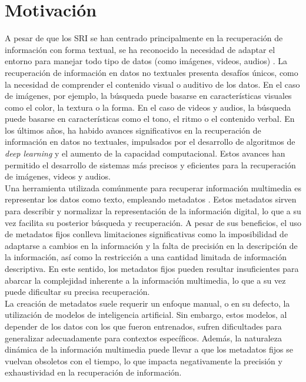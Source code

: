 \section{Motivación}
\label{sec:motivation}

A pesar de que los SRI se han centrado principalmente en la recuperación de información con forma textual, se ha reconocido la necesidad de adaptar el entorno para manejar todo tipo de datos (como imágenes, videos, audios) \cite{JianMMIR}. La recuperación de información en datos no textuales presenta desafíos únicos, como la necesidad de comprender el contenido visual o auditivo de los datos. En el caso de imágenes, por ejemplo, la búsqueda puede basarse en características visuales como el color, la textura o la forma. En el caso de videos y audios, la búsqueda puede basarse en características como el tono, el ritmo o el contenido verbal. En los últimos años, ha habido avances significativos en la recuperación de información en datos no textuales, impulsados por el desarrollo de algoritmos de \textit{deep learning} y el aumento de la capacidad computacional. %
Estos avances han permitido el desarrollo de sistemas más precisos y eficientes para la recuperación de imágenes, videos y audios.\\
Una herramienta utilizada comúnmente para recuperar información multimedia es representar los datos como texto, empleando metadatos \cite{Doh2022TowardUT}.
Estos metadatos sirven para describir y normalizar la representación de la información digital, lo que a su vez facilita su posterior búsqueda y recuperación. A pesar de sus beneficios, el uso de metadatos fijos conlleva limitaciones significativas como la imposibilidad de adaptarse a cambios en la información y la falta de precisión en la descripción de la información, así como la restricción a una cantidad limitada de información descriptiva. En este sentido, los metadatos fijos pueden resultar insuficientes para abarcar la complejidad inherente a la información multimedia, lo que a su vez puede dificultar su precisa recuperación. \\
La creación de metadatos suele requerir un enfoque manual, o en su defecto, la utilización de modelos de inteligencia artificial. Sin embargo, estos modelos, al depender de los datos con los que fueron entrenados, sufren dificultades para generalizar adecuadamente para contextos específicos. Además, la naturaleza dinámica de la información multimedia puede llevar a que los metadatos fijos se vuelvan obsoletos con el tiempo, lo que impacta negativamente la precisión y exhaustividad en la recuperación de información. \\ %
